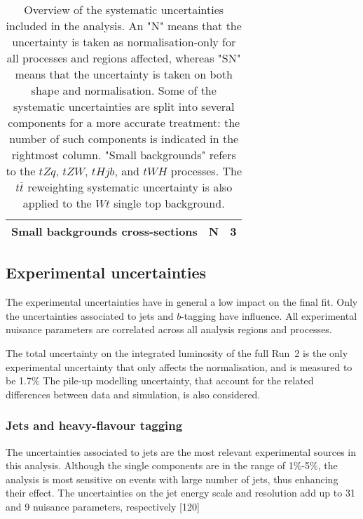 \begin{table}[htbp]
\begin{tabular}{lcc}
  \hspace{2ex}Small backgrounds cross-sections	&   N  &  3  \\
  \bottomrule
  \bottomrule
  \end{tabular}
  \caption{
  Overview of the systematic uncertainties included in the analysis.
  An "N" means that the uncertainty is taken as normalisation-only for all processes and regions affected,  whereas "SN" means that the uncertainty is taken on both shape and normalisation. Some of the systematic uncertainties are split into several components for a more accurate treatment:  the number of such components is indicated in the rightmost column.
  "Small backgrounds" refers to the $tZq$, $tZW$, %
  $tHjb$, and $tWH$ processes. The $t\bar t$ reweighting systematic uncertainty is also applied to the $Wt$ single top background.
  }
  \label{Hplustb:tablesys}
\end{table}

\subsection{Experimental uncertainties}
The experimental uncertainties have in general a low impact on the final fit. Only the uncertainties associated to jets and $b$-tagging have influence. All experimental nuisance parameters are correlated across all analysis regions and processes.

The total uncertainty on the integrated luminosity of the full Run~2 is the only experimental uncertainty that only affects the normalisation, and is measured to be 1.7\% %
The pile-up modelling uncertainty, that account for the related differences between data and simulation, is also considered.%

\subsubsection{Jets and heavy-flavour tagging}
The uncertainties associated to jets are the most relevant experimental sources in this analysis. Although the single components are in the range of 1\%-5\%, the analysis is most sensitive on events with large number of jets, thus enhancing their effect. The uncertainties on the jet energy scale and resolution add up to 31 and 9 nuisance parameters, respectively [120] %

